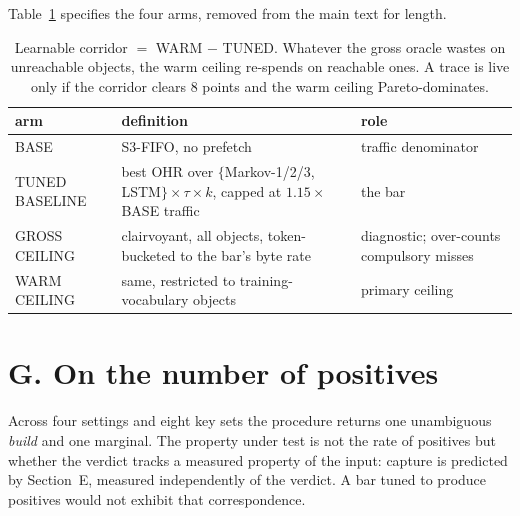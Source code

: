 \documentclass[letterpaper]{article} %
\begin{document}
\noindent Table~\ref{tab:s-arms} specifies the four arms, removed from the main text for length.

\begin{table}[htbp]
\centering\footnotesize
\setlength{\tabcolsep}{3pt}
\begin{tabular}{p{1.7cm}p{3.2cm}p{2.85cm}}
\toprule
arm & definition & role \\
\midrule
BASE & S3-FIFO, no prefetch & traffic denominator \\
TUNED BASELINE & best OHR over $\{$Markov-1/2/3, LSTM$\}\times\tau\times k$, capped at $1.15\times$ BASE traffic & the bar \\
GROSS CEILING & clairvoyant, all objects, token-bucketed to the bar's byte rate & diagnostic; over-counts compulsory misses \\
WARM CEILING & same, restricted to training-vocabulary objects & primary ceiling \\
\bottomrule
\end{tabular}
\caption{Learnable corridor $=$ WARM $-$ TUNED. Whatever the gross oracle wastes on unreachable
objects, the warm ceiling re-spends on reachable ones. A trace is live only if the corridor clears
8 points and the warm ceiling Pareto-dominates.}
\label{tab:s-arms}
\end{table}

\section{G. On the number of positives}

\noindent Across four settings and eight key sets the procedure returns one unambiguous \emph{build}
and one marginal. The property under test is not the rate of positives but whether the verdict
tracks a measured property of the input: capture is predicted by Section~E, measured independently
of the verdict. A bar tuned to produce positives would not exhibit that correspondence.
\end{document}
